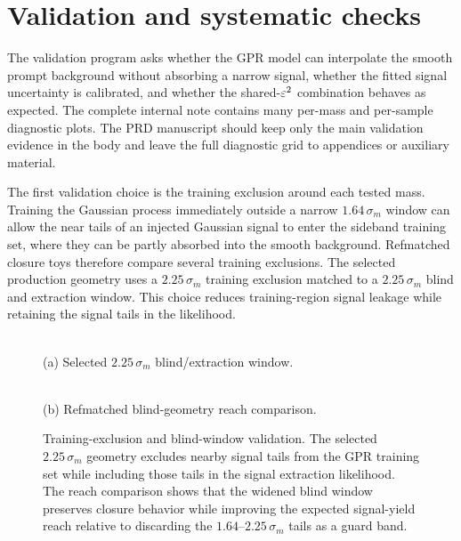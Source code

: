 \section{Validation and systematic checks}
\label{sec:validation}

The validation program asks whether the GPR model can interpolate the smooth prompt
background without absorbing a narrow signal, whether the fitted signal uncertainty is
calibrated, and whether the shared-$\varepsilon^2$ combination behaves as expected. The
complete internal note contains many per-mass and per-sample diagnostic plots. The PRD
manuscript should keep only the main validation evidence in the body and leave the
full diagnostic grid to appendices or auxiliary material.

The first validation choice is the training exclusion around each tested mass.
Training the Gaussian process immediately outside a narrow $1.64\,\sigma_m$ window can
allow the near tails of an injected Gaussian signal to enter the sideband training set,
where they can be partly absorbed into the smooth background. Refmatched closure toys
therefore compare several training exclusions. The selected production geometry uses a
$2.25\,\sigma_m$ training exclusion matched to a $2.25\,\sigma_m$ blind and extraction
window. This choice reduces training-region signal leakage while retaining the signal
tails in the likelihood.

\begin{figure}[t]
\centering
\begin{minipage}{0.47\textwidth}
\centering
{}\\
(a) Selected $2.25\,\sigma_m$ blind/extraction window.
\end{minipage}
\hfill
\begin{minipage}{0.47\textwidth}
\centering
{}\\
(b) Refmatched blind-geometry reach comparison.
\end{minipage}
\caption{Training-exclusion and blind-window validation. The selected
$2.25\,\sigma_m$ geometry excludes nearby signal tails from the GPR training set while
including those tails in the signal extraction likelihood. The reach comparison shows
that the widened blind window preserves closure behavior while improving the expected
signal-yield reach relative to discarding the $1.64$--$2.25\,\sigma_m$ tails as a
guard band.}
\label{fig:blind-validation}
\end{figure}

